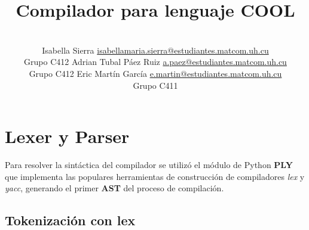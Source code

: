 \documentclass[a4paper,10pt,twocolumn]{article}
\title{Compilador para lenguaje COOL}
\author{\\
\name Isabella Sierra \email \href{mailto:isabellamaria.sierra@estudiantes.matcom.uh.cu}{isabellamaria.sierra@estudiantes.matcom.uh.cu}
	\\ \addr Grupo C412 \AND
\name Adrian Tubal Páez Ruiz \email \href{mailto:a.paez@estudiantes.matcom.uh.cu}{a.paez@estudiantes.matcom.uh.cu}
	\\ \addr Grupo C412  \AND
\name Eric Martín García \email \href{mailto:e.martin@estudiantes.matcom.uh.cu}{e.martin@estudiantes.matcom.uh.cu}
	\\ \addr Grupo C411 
 }
\begin{document}






\section{Lexer y Parser}

Para resolver la sintáctica del compilador se utilizó el módulo de Python \textbf{PLY} que implementa las populares herramientas de construcción de compiladores \textit{lex} y \textit{yacc}, generando el primer \textbf{AST} del proceso de compilación.

\subsection{Tokenización con lex}
\end{document}
